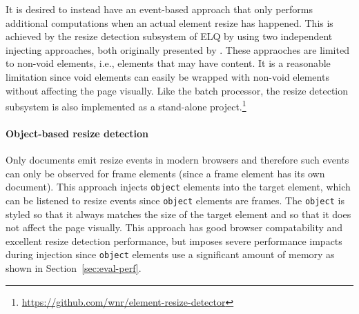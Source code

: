 \documentclass{acm_proc_article-sp}
\newcommand{\code}[1]{\texttt{#1}}
\newcommand{\elq}{ELQ}
\newcommand{\gls}[1]{#1}
\begin{document}


    It is desired to instead have an event-based approach that only performs additional computations when an actual element resize has happened.
    This is achieved by the resize detection subsystem of \elq{} by using two independent injecting approaches, both originally presented by \cite{backalley}.
    These appraoches are limited to non-void elements, i.e., elements that may have content.
    It is a reasonable limitation since void elements can easily be wrapped with non-void elements without affecting the page visually.
    Like the batch processor, the resize detection subsystem is also implemented as a stand-alone project.\footnote{\url{https://github.com/wnr/element-resize-detector}}

    \paragraph{Object-based resize detection}
    Only documents emit resize events in modern browsers and therefore such events can only be observed for frame elements (since a frame \gls{element} has its own \gls{document}).
    This approach injects \code{object} elements into the target element, which can be listened to resize events since \code{object} elements are frames.
    The \code{object} is styled so that it always matches the size of the target \gls{element} and so that it does not affect the page visually.
    This approach has good browser compatability and excellent resize detection performance, but imposes severe performance impacts during injection since \code{object} elements use a significant amount of memory as shown in Section~\ref{sec:eval-perf}.
\end{document}
